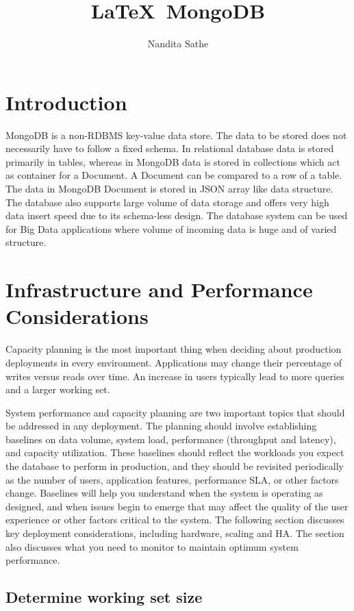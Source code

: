 \documentclass[9pt,twocolumn,twoside]{styles/osajnl}
\title{\LaTeX\ MongoDB}
\author[1,*]{Nandita Sathe}
\affil[1]{School of Informatics and Computing, Bloomington, IN 47408, U.S.A.}
\affil[*]{Corresponding author: nsathe@iu.edu}
\begin{document}
\maketitle

\section{Introduction}

MongoDB is a non-RDBMS key-value data store. The data to be stored does not necessarily have to follow a fixed schema. In relational database data is stored primarily in tables, whereas in MongoDB data is stored in collections which act as container for a Document. A Document can be compared to a row of a table. The data in MongoDB Document is stored in JSON array like data structure. The database also supports large volume of data storage and offers very high data insert speed due to its schema-less design. The database system can be used for Big Data applications where volume of incoming data is huge and of varied structure.

\section{Infrastructure and Performance Considerations}

Capacity planning is the most important thing when deciding about production deployments in every environment. Applications may change their percentage of writes versus reads over time. An increase in users typically lead to more queries and a larger working set.

System performance and capacity planning are two important topics that should be addressed in any deployment. The planning should involve establishing baselines on data volume, system load, performance (throughput and latency), and capacity utilization. These baselines should reflect the workloads you expect the database to perform in production, and they should be revisited periodically as the number of users, application features, performance SLA, or other factors change. Baselines will help you understand when the system is operating as designed, and when issues begin to emerge that may affect the quality of the user experience or other factors critical to the system. The following section discusses key deployment considerations, including hardware, scaling and HA. The section also discusses what you need to monitor to maintain optimum system performance.

\subsection{Determine working set size}
\end{document}
